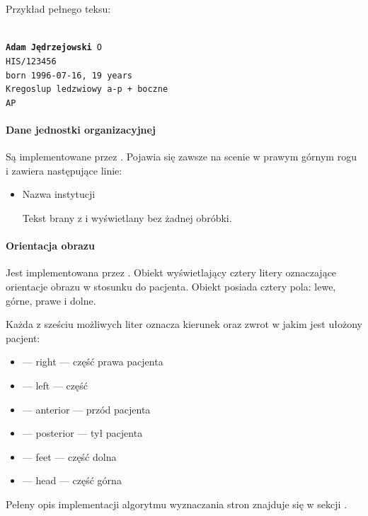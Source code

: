 Przykład pełnego teksu:

\texttt{\\
    \textbf{Adam Jędrzejowski} O\\
    HIS/123456\\
    born 1996-07-16, 19 years\\
    Kregoslup ledzwiowy a-p + boczne\\
    AP
}

\paragraph{Dane jednostki organizacyjnej}

Są implementowane przez .
Pojawia się zawsze na scenie w prawym górnym rogu i zawiera następujące linie:
\begin{itemize}
    \item Nazwa instytucji

          Tekst brany z  i wyświetlany bez żadnej obróbki.

\end{itemize}

\paragraph{Orientacja obrazu}

\par
Jest implementowana przez .
Obiekt wyświetlający cztery litery oznaczające orientacje obrazu w stosunku do pacjenta.
Obiekt posiada cztery pola: lewe, górne, prawe i dolne.

\par
Każda z sześciu możliwych liter oznacza kierunek oraz zwrot w jakim jest ułożony pacjent:
\begin{itemize}
    \item {} --- right --- część prawa pacjenta
    \item {} --- left --- część
    \item {} --- anterior --- przód pacjenta
    \item {} --- posterior --- tył pacjenta
    \item {} --- feet --- część dolna
    \item {} --- head --- część górna
\end{itemize}

\par
Pełeny opis implementacji algorytmu wyznaczania stron znajduje się w sekcji \label{sec:algorithm-imageorientationindicator}.

